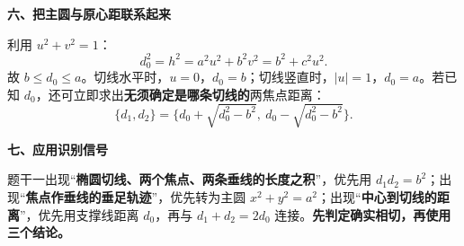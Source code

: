\begin{explanationbox}
\textbf{六、把主圆与原心距联系起来}

利用 $u^2+v^2=1$：
\[
d_0^2=h^2=a^2u^2+b^2v^2=b^2+c^2u^2.
\]
故 $b\le d_0\le a$。切线水平时，$u=0$，$d_0=b$；切线竖直时，$|u|=1$，$d_0=a$。若已知 $d_0$，还可立即求出\textbf{无须确定是哪条切线的}两焦点距离：
\[
\boxed{\{d_1,d_2\}=\{d_0+\sqrt{d_0^2-b^2},\ d_0-\sqrt{d_0^2-b^2}\}}.
\]

\textbf{七、应用识别信号}

题干一出现“\textbf{椭圆切线、两个焦点、两条垂线的长度之积}”，优先用 $d_1d_2=b^2$；出现“\textbf{焦点作垂线的垂足轨迹}”，优先转为主圆 $x^2+y^2=a^2$；出现“\textbf{中心到切线的距离}”，优先用支撑线距离 $d_0$，再与 $d_1+d_2=2d_0$ 连接。\textbf{先判定确实相切，再使用三个结论。}
\end{explanationbox}
